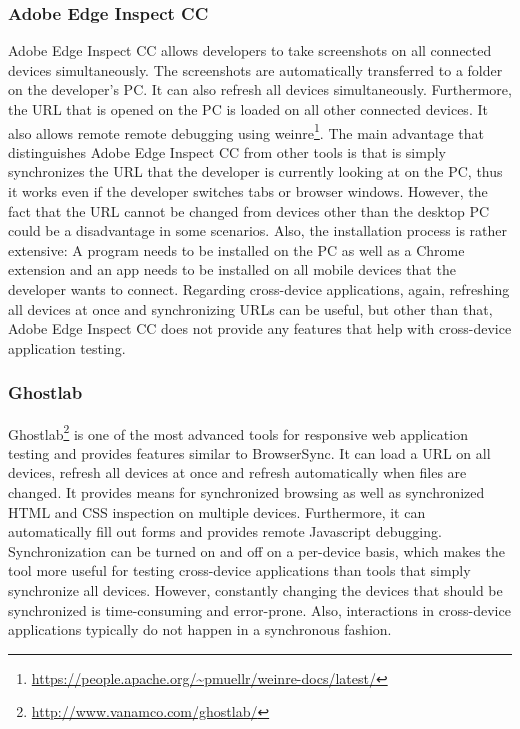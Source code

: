 \subsubsection{Adobe Edge Inspect CC}

Adobe Edge Inspect CC allows developers to take screenshots on all connected devices simultaneously. The screenshots are automatically transferred to a folder on the developer's PC. It can also refresh all devices simultaneously. Furthermore, the URL that is opened on the PC is loaded on all other connected devices. It also allows remote remote debugging using weinre\footnote{\url{https://people.apache.org/~pmuellr/weinre-docs/latest/}}. The main advantage that distinguishes Adobe Edge Inspect CC from other tools is that is simply synchronizes the URL that the developer is currently looking at on the PC, thus it works even if the developer switches tabs or browser windows. However, the fact that the URL cannot be changed from devices other than the desktop PC could be a disadvantage in some scenarios. Also, the installation process is rather extensive: A program needs to be installed on the PC as well as a Chrome extension and an app needs to be installed on all mobile devices that the developer wants to connect. Regarding cross-device applications, again, refreshing all devices at once and synchronizing URLs can be useful, but other than that, Adobe Edge Inspect CC does not provide any features that help with cross-device application testing.

\subsubsection{Ghostlab}

Ghostlab\footnote{\url{http://www.vanamco.com/ghostlab/}} is one of the most advanced tools for responsive web application testing and provides features similar to BrowserSync. It can load a URL on all devices, refresh all devices at once and refresh automatically when files are changed. It provides means for synchronized browsing as well as synchronized HTML and CSS inspection on multiple devices. Furthermore, it can automatically fill out forms and provides remote Javascript debugging. Synchronization can be turned on and off on a per-device basis, which makes the tool more useful for testing cross-device applications than tools that simply synchronize all devices. However, constantly changing the devices that should be synchronized is time-consuming and error-prone. Also, interactions in cross-device applications typically do not happen in a synchronous fashion.

